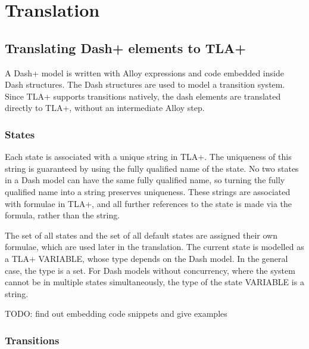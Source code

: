 \chapter{Translation}



\section{Translating Dash+ elements to TLA+}

A Dash+ model is written with Alloy expressions and code embedded inside Dash structures. The Dash structures are used to model a transition system. Since TLA+ supports transitions natively, the dash elements are translated directly to TLA+, without an intermediate Alloy step.


\subsection{States}

Each state is associated with a unique string in TLA+. The uniqueness of this string is guaranteed by using the fully qualified name of the state. No two states in a Dash model can have the same fully qualified name, so turning the fully qualified name into a string preserves uniqueness. These strings are associated with formulae in TLA+, and all further references to the state is made via the formula, rather than the string.

The set of all states and the set of all default states are assigned their own formulae, which are used later in the translation. The current state is modelled as a TLA+ VARIABLE, whose type depends on the Dash model. In the general case, the type is a set. For Dash models without concurrency, where the system cannot be in multiple states simultaneously, the type of the state VARIABLE is a string.

TODO: find out embedding code snippets and give examples

\subsection{Transitions}

